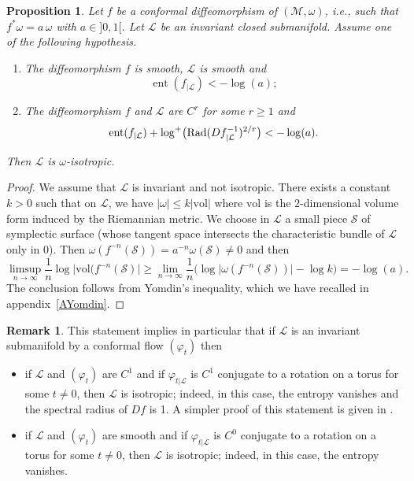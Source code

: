 \documentclass[11pt]{article}
\newcommand{\ie}{i.e.,\xspace}
\numberwithin{equation}{section}
\numberwithin{figure}{section}
\numberwithin{table}{section}
\newtheorem{proposition}{Proposition}
\theoremstyle{definition}
\newtheorem{remark}[theorem]{Remark}
\def\cL{{\mathcal L}}
\def\cM{{\mathcal M}}
\def\cS{{\mathcal S}}
\DeclareMathOperator{\ent}{ent}
\begin{document}
\begin{proposition}\label{PYomdin}
Let $f$ be a conformal diffeomorphism of $(\cM, \omega)$, \ie such that $f^*\omega=a\,\omega$ with $a\in{}]0, 1[$. Let ${\cL}$ be an invariant closed submanifold. Assume one of the following hypothesis.
\begin{enumerate}
\item The diffeomorphism $f$ is smooth, $\cL$ is smooth and\vspace*{-3pt}
\[
\ent(f_{|{\cL}}) < - \log(a);
\]
\item The diffeomorphism $f$ and $\cL$ are $C^r$ for some $r\geq 1$ and\vspace*{-3pt}
\[
\ent(f_{|{\cL}}) + \log^+\bigl(\text{\rm Rad} (Df^{-1}_{|{\cL}})^{2/r}\bigr) < -\log(a).
\]
\end{enumerate}
Then ${\cL}$ is $\omega$-isotropic.
\end{proposition}

\begin{proof}
We assume that $\cL$ is invariant and not isotropic. There exists a constant $k>0$ such that on $\cL$, we have $\vert\omega\vert\leq k\vert \mathrm{vol}\vert$ where $\mathrm{vol}$ is the $2$\nobreakdash-dimensional volume form induced by the Riemannian metric. We choose in $\cL$ a small piece $\cS$ of symplectic surface (whose tangent space intersects the characteristic bundle of $\cL$ only in $0$). Then $\omega(f^{-n}(\cS))=a^{-n}\omega(\cS)\not=0$ and then
\[
\limsup_{n\to \infty} \frac{1}{n}\log\Big\vert \mathrm{vol}(f^{-n}
(\cS)\Big\vert\geq \lim_{n\to\infty}\frac{1}{n}\big(\log\vert \omega(f^{-n}(\cS))\vert-\log k\big)=-\log(a).
\]
The conclusion follows from Yomdin's inequality, which we have recalled in appendix~\ref{AYomdin}.
\end{proof}

\begin{remark}
This statement implies in particular that if $\cL$ is an invariant submanifold by a conformal flow $(\varphi_t)$ then
\begin{itemize}
\item if $\cL$ and $(\varphi_t)$ are $C^1$ and if $\varphi_{t|\cL}$ is $C^1$ conjugate to a rotation on a torus for some $t\not=0$, then $\cL$ is isotropic; indeed, in this case, the entropy vanishes and the spectral radius of $Df$ is 1. A simpler proof of this statement is given in \cite{CaCeLlA2013}.
\item if $\cL$ and $(\varphi_t)$ are smooth and if $\varphi_{t|\cL}$ is $C^0$ conjugate to a rotation on a torus for some $t\not=0$, then $\cL$ is isotropic; indeed, in this case, the entropy vanishes.
\end{itemize}
\end{remark}
\end{document}

